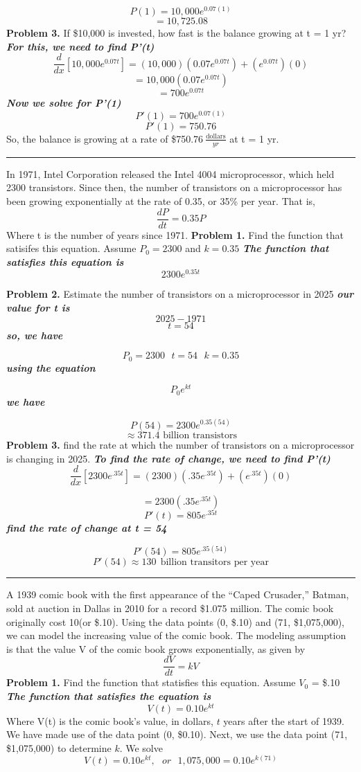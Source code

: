 \documentclass{report}
\begin{document}
$$ P(1) = 10,000e^{0.07(1)}$$
$$ = 10,725.08$$
\bigbreak \noindent
\textbf{Problem 3.} If \$10,000 is invested, how fast is the balance growing at t = 1 yr?
\bigbreak \noindent
\textit{\textbf{For this, we need to find P'(t)}}
$$ \frac{d}{dx}\left[10,000e^{0.07t}\right] = (10,000)\left(0.07e^{0.07t}\right) + \left(e^{0.07t}\right)(0)$$
$$ = 10,000(0.07e^{0.07t})$$
$$ = 700e^{0.07t}$$
\textit{\textbf{Now we solve for P'(1)}}
$$ P'(1) = 700e^{0.07(1)}$$
$$ P'(1) = 750.76$$
\bigbreak \noindent
So, the balance is growing at a rate of \$750.76$ \ \frac{\text{dollars}}{yr}$ at t = 1 yr.
\bigbreak \noindent
\hrule
\bigbreak \noindent
\q
In 1971, Intel Corporation released the Intel 4004 microprocessor, which held 2300 transistors. Since then, the number of transistors on a microprocessor has been growing exponentially at the rate of 0.35, or 35\% per year. That is,
$$ \dfrac{dP}{dt} = 0.35P$$
Where t is the number of years since 1971.
\bigbreak \noindent
\textbf{Problem 1.} Find the function that satisifes this equation. Assume $P_0 = 2300$ and $k = 0.35$
\bigbreak \noindent
\textit{\textbf{The function that satisfies this equation is}}
$$ 2300e^{0.35t}$$
\bigbreak \noindent

\pagebreak
\noindent\textbf{Problem 2.} Estimate the number of transistors on a microprocessor in 2025
\bigbreak \noindent
\textit{\textbf{our value for t is}}
$$ 2025 - 1971$$
$$ t = 54$$
\textit{\textbf{so, we have}}

$$ P_0 = 2300 \ \ \ t = 54 \ \ \ k = 0.35$$
\textit{\textbf{using the equation}}

$$ P_0e^{kt}$$
\textit{\textbf{we have}}

$$P(54) = 2300e^{0.35(54)}$$
$$\approx 371.4 \text{ billion transistors}$$
\bigbreak \noindent
\textbf{Problem 3.} find the rate at which the number of transistors on a microprocessor is changing in 2025.
\bigbreak \noindent
\textit{\textbf{To find the rate of change, we need to find P'(t)}}
$$ \frac{d}{dx}\left[2300e^{.35t}\right] = (2300)(.35e^{.35t}) + (e^{.35t})(0)$$

$$ = 2300(.35e^{.35t})$$
$$ P'(t)= 805e^{.35t}$$
\textit{\textbf{find the rate of change at t = 54}}

$$ P'(54) = 805e^{.35(54)}$$
$$ P'(54) \approx 130 \ \ \text{billion transitors per year}$$
\bigbreak \noindent
\hrule
\bigbreak \noindent
\q
A 1939 comic book with the first appearance of the ``Caped Crusader,'' Batman, sold at auction in Dallas in 2010 for a record \$1.075 million. The comic book originally cost 10\cent (or \$.10). Using the data points (0, \$.10) and (71, \$1,075,000), we can model the increasing value of the comic book. The modeling assumption is that the value V of the comic book grows exponentially, as given by
$$ \dfrac{dV}{dt} = kV$$
\bigbreak \noindent
\textbf{Problem 1.} Find the function that statisfies this equation. Assume $V_0$ = \$.10
\bigbreak \noindent
\textit{\textbf{The function that satisfies the equation is}}
$$ V(t) = 0.10e^{kt}$$
Where V(t) is the comic book's value, in dollars, $t$ years after the start of 1939.
We have made use of the data point (0, \$0.10). Next, we use the data point (71, \$1,075,000) to determine $k$. We solve
$$ V(t) = 0.10e^{kt}, \ \ \ or \ \ \ 1,075,000 = 0.10e^{k(71)}$$
\bigbreak \noindent
\end{document}
